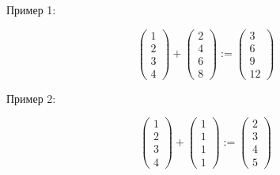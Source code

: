 \begin{frame}

    Пример 1:

    \begin{equation*}
        \left(
        \begin{array}{c}
            1 \\
            2 \\
            3 \\
            4
        \end{array}
        \right)
        +
        \left(
        \begin{array}{c}
             2 \\
             4 \\
             6 \\
             8
        \end{array}
        \right)
        :=
        \left(
        \begin{array}{c}
            3 \\
            6 \\
            9 \\
            12
        \end{array}
        \right)
    \end{equation*}

    Пример 2:

    \begin{equation*}
        \left(
        \begin{array}{c}
            1 \\
            2 \\
            3 \\
            4
        \end{array}
        \right)
        +
        \left(
        \begin{array}{c}
             1 \\
             1 \\
             1 \\
             1
        \end{array}
        \right)
        :=
        \left(
        \begin{array}{c}
            2 \\
            3 \\
            4 \\
            5
        \end{array}
        \right)
    \end{equation*}
    
\end{frame}

